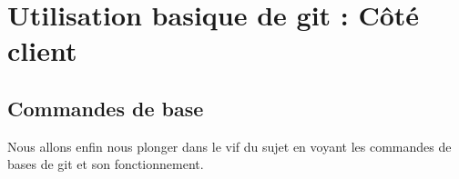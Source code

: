 \part{Utilisation basique de git : Côté client}



\chapter{Commandes de base}

Nous allons enfin nous plonger dans le vif du sujet en voyant les commandes de bases de git et son fonctionnement.






